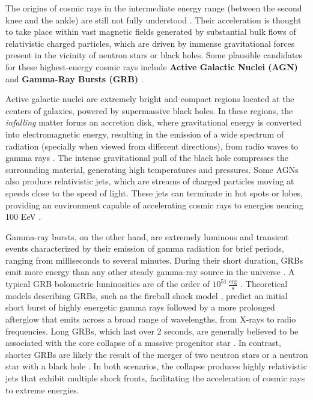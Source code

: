 The origins of cosmic rays in the intermediate energy range (between the second knee and the ankle) are still not fully understood . Their acceleration is thought to take place within vast magnetic fields generated by substantial bulk flows of relativistic charged particles, which are driven by immense gravitational forces present in the vicinity of neutron stars or black holes. Some plausible candidates for these highest-energy cosmic rays include \textbf{Active Galactic Nuclei (AGN)}  and \textbf{Gamma-Ray Bursts (GRB)} . 

Active galactic nuclei are extremely bright and compact regions located at the centers of galaxies, powered by supermassive black holes. In these regions, the \emph{infalling} matter forms an accretion disk, where gravitational energy is converted into electromagnetic energy, resulting in the emission of a wide spectrum of radiation (specially when viewed from different directions), from radio waves to gamma rays . The intense gravitational pull of the black hole compresses the surrounding material, generating high temperatures and pressures. Some AGNs also produce relativistic jets, which are streams of charged particles moving at speeds close to the speed of light. These jets can terminate in hot spots or lobes, providing an environment capable of accelerating cosmic rays to energies nearing 100 EeV . 

Gamma-ray bursts, on the other hand, are extremely luminous and transient events characterized by their emission of gamma radiation for brief periods, ranging from milliseconds to several minutes. During their short duration, GRBs emit more energy than any other steady gamma-ray source in the universe \cite{AGN_picture}. A typical GRB bolometric luminosities are of the order of $10^{51} \,\frac{\text{erg}}{\text{s}}$ . Theoretical models describing GRBs, such as the fireball shock model , predict an initial short burst of highly energetic gamma rays followed by a more prolonged afterglow that emits across a broad range of wavelengths, from X-rays to radio frequencies. Long GRBs, which last over 2 seconds, are generally believed to be associated with the core collapse of a massive progenitor star . In contrast, shorter GRBs are likely the result of the merger of two neutron stars or a neutron star with a black hole . In both scenarios, the collapse produces highly relativistic jets that exhibit multiple shock fronts, facilitating the acceleration of cosmic rays to extreme energies.


